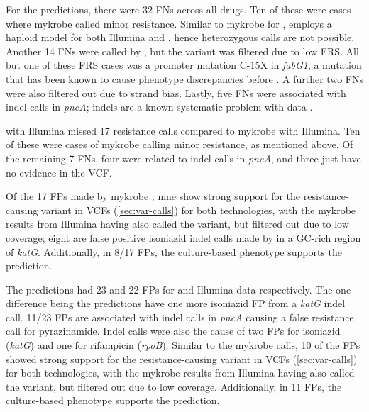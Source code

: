 For the \drprg{} \ont{} predictions, there were 32 FNs across all drugs. Ten of these were cases where mykrobe called minor resistance. Similar to mykrobe for \ont{}, \drprg{} employs a haploid model for both Illumina and \ont{}, hence heterozygous calls are not possible. Another 14 FNs were called by \drprg{} \ont{}, but the variant was filtered due to low FRS. All but one of these FRS cases was a promoter mutation C-15X in \textit{fabG1}, a mutation that has been known to cause phenotype discrepancies before \cite{cryptic2018}. A further two FNs were also filtered out due to strand bias. Lastly, five FNs were associated with indel calls in \textit{pncA}; indels are a known systematic problem with \ont{} data \cite{watson2019}.

\drprg{} with Illumina missed 17 resistance calls compared to mykrobe with Illumina. Ten of these were cases of mykrobe calling minor resistance, as mentioned above. Of the remaining 7 FNs, four were related to indel calls in \textit{pncA}, and three just have no evidence in the \drprg{} VCF.

Of the 17 FPs made by mykrobe \ont{}; nine show strong support for the resistance-causing variant in VCFs (\autoref{sec:var-calls}) for both technologies, with the mykrobe results from Illumina having also called the variant, but filtered out due to low coverage; eight are false positive isoniazid indel calls made by \ont{} in a GC-rich region of \textit{katG}. Additionally, in 8/17 FPs, the culture-based phenotype supports the \ont{} prediction.

The \drprg{} predictions had 23 and 22 FPs for \ont{} and Illumina data respectively. The one difference being the \ont{} predictions have one more isoniazid FP from a \textit{katG} indel call. 11/23 FPs are associated with indel calls in \textit{pncA} causing a false resistance call for pyrazinamide. Indel calls were also the cause of two FPs for isoniazid (\textit{katG}) and one for rifampicin (\textit{rpoB}). Similar to the mykrobe \ont{} calls, 10 of the \drprg{} FPs showed strong support for the resistance-causing variant in VCFs (\autoref{sec:var-calls}) for both technologies, with the mykrobe results from Illumina having also called the variant, but filtered out due to low coverage. Additionally, in 11 FPs, the culture-based phenotype supports the \drprg{} prediction.


